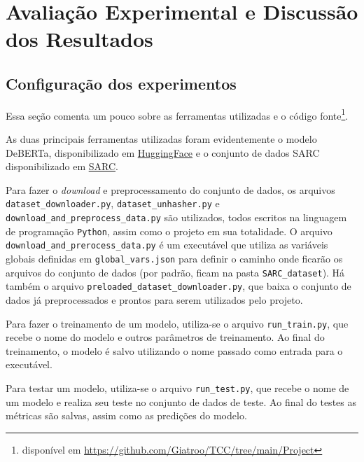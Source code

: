 

\chapter{Avaliação Experimental e Discussão dos Resultados}%
\label{cha:avaliacao_experimental_e_discussao_dos_resultados}

\section{Configuração dos experimentos}%
\label{sec:configuracao_dos_experimentos}

Essa seção comenta um pouco sobre as ferramentas utilizadas e o
código fonte\footnote{disponível em
\href{https://github.com/Giatroo/TCC/tree/main/Project}{https://github.com/Giatroo/TCC/tree/main/Project}}.

As duas principais ferramentas utilizadas foram evidentemente o modelo
DeBERTa, disponibilizado em
\href{https://huggingface.co/docs/transformers/model_doc/deberta}{HuggingFace}
e o conjunto de dados SARC disponibilizado em
\href{https://nlp.cs.princeton.edu/SARC/}{SARC}.

Para fazer o \textit{download} e preprocessamento do conjunto de dados, os
arquivos \texttt{dataset\_downloader.py}, \texttt{dataset\_unhasher.py} e
\texttt{download\_and\_preprocess\_data.py} são utilizados, todos escritos na
linguagem de programação \texttt{Python}, assim como o projeto em sua
totalidade. O arquivo \texttt{download\_and\_prerocess\_data.py} é um executável
que utiliza as variáveis globais definidas em \texttt{global\_vars.json} para
definir o caminho onde ficarão os arquivos do conjunto de dados (por padrão,
ficam na pasta \texttt{SARC\_dataset}). Há também o arquivo
\texttt{preloaded\_dataset\_downloader.py}, que baixa o conjunto de dados já
preprocessados e prontos para serem utilizados pelo projeto.

Para fazer o treinamento de um modelo, utiliza-se o arquivo
\texttt{run\_train.py}, que recebe o nome do modelo e outros parâmetros de
treinamento. Ao final do treinamento, o modelo é salvo utilizando o nome passado
como entrada para o executável.

Para testar um modelo, utiliza-se o arquivo \texttt{run\_test.py}, que recebe o
nome de um modelo e realiza seu teste no conjunto de dados de teste. Ao final do
testes as métricas são salvas, assim como as predições do modelo.

